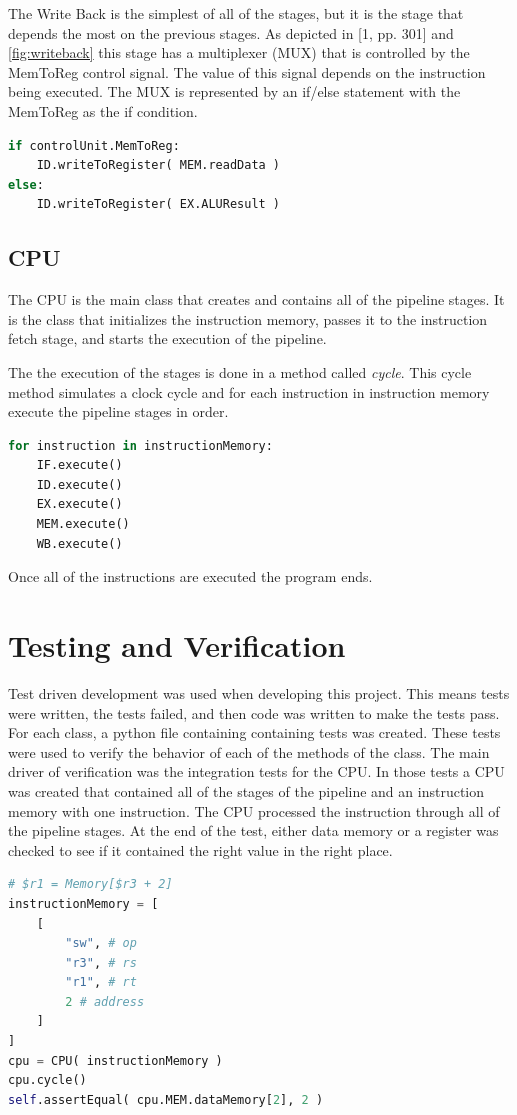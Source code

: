 \documentclass[conference]{IEEEtran}
\begin{document}
The Write Back is the simplest of all of the stages, but it is the stage that depends the most on the previous stages.  As depicted in [1, pp. 301] and \ref{fig:writeback} this stage has a multiplexer (MUX) that is controlled by the MemToReg control signal.  The value of this signal depends on the instruction being executed.  The MUX is represented by an if/else statement with the MemToReg as the if condition.

\begin{lstlisting}[language=Python]
if controlUnit.MemToReg:
    ID.writeToRegister( MEM.readData )
else:
    ID.writeToRegister( EX.ALUResult )
\end{lstlisting}

\subsection{CPU}
The CPU is the main class that creates and contains all of the pipeline stages.  It is the class that initializes the instruction memory, passes it to the instruction fetch stage, and starts the execution of the pipeline.

The the execution of the stages is done in a method called \textit{cycle}.  This cycle method simulates a clock cycle and for each instruction in instruction memory execute the pipeline stages in order.

\begin{lstlisting}[language=Python]
for instruction in instructionMemory:
    IF.execute()
    ID.execute()
    EX.execute()
    MEM.execute()
    WB.execute()
\end{lstlisting}

Once all of the instructions are executed the program ends.

\section{Testing and Verification}

Test driven development was used when developing this project.  This means tests were written, the tests failed, and then code was written to make the tests pass.  For each class, a python file containing containing tests was created.  These tests were used to verify the behavior of each of the methods of the class.
The main driver of verification was the integration tests for the CPU.  In those tests a CPU was created that contained all of the stages of the pipeline and an instruction memory with one instruction.  The CPU processed the instruction through all of the pipeline stages.  At the end of the test, either data memory or a register was checked to see if it contained the right value in the right place.
\begin{lstlisting}[language=Python]
# $r1 = Memory[$r3 + 2]
instructionMemory = [
    [
        "sw", # op
        "r3", # rs
        "r1", # rt
        2 # address
    ]
]
cpu = CPU( instructionMemory )
cpu.cycle()
self.assertEqual( cpu.MEM.dataMemory[2], 2 )
\end{lstlisting}
\end{document}
